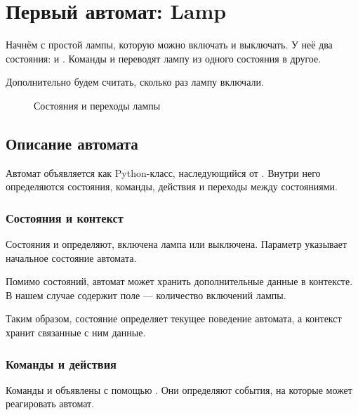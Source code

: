 
\chapter{Первый автомат: Lamp}
\label{chap:first-automaton}

Начнём с простой лампы, которую можно включать и выключать.
У неё два состояния:  и . Команды
 и  переводят лампу
из одного состояния в другое.

Дополнительно будем считать, сколько раз лампу включали.

\begin{figure}[ht]
  \centering
  
  \caption{Состояния и переходы лампы}
  \label{fig:lamp}
\end{figure}

\section{Описание автомата}

Автомат объявляется как Python-класс, наследующийся
от . Внутри него определяются состояния,
команды, действия и переходы между состояниями.



\subsection{Состояния и контекст}

Состояния  и  определяют,
включена лампа или выключена.
Параметр  указывает начальное
состояние автомата.

Помимо состояний, автомат может хранить дополнительные
данные в контексте. В нашем случае 
содержит поле  --- количество
включений лампы.

Таким образом, состояние определяет текущее поведение
автомата, а контекст хранит связанные с ним данные.

\subsection{Команды и действия}

Команды  и  объявлены
с помощью . Они определяют
события, на которые может реагировать автомат.

